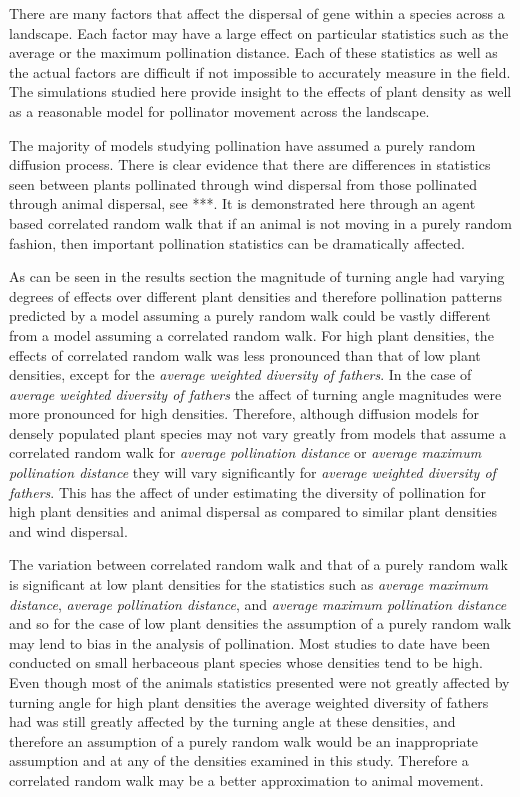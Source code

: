 There are many factors that affect the dispersal of gene within a species across a landscape.  Each
factor may have a large effect on particular statistics such as the average or the maximum
pollination distance.  Each of these statistics as well as the actual factors are difficult if not
impossible to accurately measure in the field.  The simulations studied here provide insight to the
effects of plant density as well as a reasonable model for pollinator movement across the landscape.

The majority of models studying pollination have assumed a purely random diffusion process. There is
clear evidence that there are differences in statistics seen between plants pollinated through wind
dispersal from those pollinated through animal dispersal, see ***.  It is demonstrated here through
an agent based correlated random walk that if an animal is not moving in a purely random fashion,
then important pollination statistics can be dramatically affected. 

As can be seen in the results section the magnitude of turning angle had varying degrees of effects
over different plant densities and therefore pollination patterns predicted by a model assuming a
purely random walk could be vastly different from a model assuming a correlated random walk. For
high plant densities, the effects of correlated random walk was less pronounced than that of low
plant densities, except for the \emph{average weighted diversity of fathers}. In the case of
\emph{average weighted diversity of fathers} the affect of turning angle magnitudes were more
pronounced for high densities. Therefore, although diffusion models for densely populated plant
species may not vary greatly from models that assume a correlated random walk for \emph{average
pollination distance} or \emph{average maximum pollination distance} they will vary significantly
for \emph{average weighted diversity of fathers}. This has the affect of under estimating the
diversity of pollination for high plant densities and animal dispersal as compared to similar plant
densities and wind dispersal.

The variation between correlated random walk and that of a purely random walk is significant at low
plant densities for the statistics such as \emph{average maximum distance}, \emph{average
pollination distance}, and \emph{average maximum pollination distance} and so for the case of low
plant densities the assumption of a purely random walk may lend to bias in the analysis of
pollination. Most studies to date have been conducted on small herbaceous plant species whose
densities tend to be high. Even though most of the animals statistics presented were not greatly
affected by turning angle for high plant densities the average weighted diversity of fathers had was
still greatly affected by the turning angle at these densities, and therefore an assumption of a
purely random walk would be an inappropriate assumption and at any of the densities examined in this
study. Therefore a correlated random walk may be a better approximation to animal movement.

